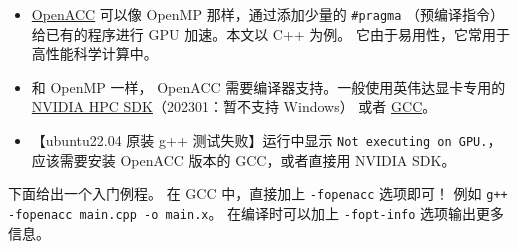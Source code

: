 
\begin{issues}
\issueDraft
\end{issues}


\begin{itemize}
\item \href{https://www.openacc.org/}{OpenACC} 可以像 OpenMP 那样，通过添加少量的 \verb`#pragma` （预编译指令）给已有的程序进行 GPU 加速。本文以 C++ 为例。 它由于易用性，它常用于高性能科学计算中。
\item 和 OpenMP 一样， OpenACC 需要编译器支持。一般使用英伟达显卡专用的 \href{https://developer.nvidia.com/hpc-sdk}{NVIDIA HPC SDK}（202301：暂不支持 Windows） 或者 \href{https://www.openacc.org/tools/gcc-for-openacc}{GCC}。
\item 【ubuntu22.04 原装 g++ 测试失败】运行中显示 \verb`Not executing on GPU.`，应该需要安装 OpenACC 版本的 GCC，或者直接用 NVIDIA SDK。
\end{itemize}

下面给出一个入门例程。 在 GCC 中，直接加上 \verb`-fopenacc` 选项即可！ 例如 \verb`g++ -fopenacc main.cpp -o main.x`。 在编译时可以加上 \verb`-fopt-info` 选项输出更多信息。

